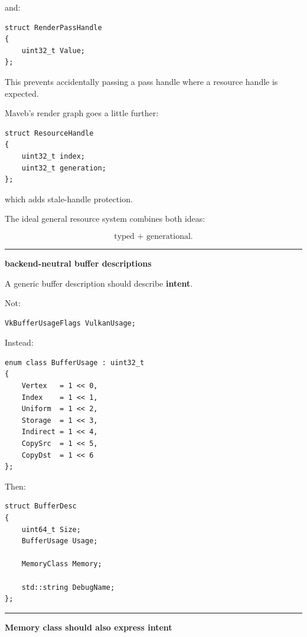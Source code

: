 and:

\begin{verbatim}
struct RenderPassHandle
{
    uint32_t Value;
};
\end{verbatim}

This prevents accidentally passing a pass handle where a resource handle is expected.

Maveb's render graph goes a little further:

\begin{verbatim}
struct ResourceHandle
{
    uint32_t index;
    uint32_t generation;
};
\end{verbatim}

which adds stale-handle protection.

The ideal general resource system combines both ideas:

\[
\boxed{
\text{typed + generational}.
}
\]

\begin{center}\rule{0.5\linewidth}{0.5pt}\end{center}

\textbf{backend-neutral buffer descriptions}

A generic buffer description should describe \textbf{intent}.

Not:

\begin{verbatim}
VkBufferUsageFlags VulkanUsage;
\end{verbatim}

Instead:

\begin{verbatim}
enum class BufferUsage : uint32_t
{
    Vertex   = 1 << 0,
    Index    = 1 << 1,
    Uniform  = 1 << 2,
    Storage  = 1 << 3,
    Indirect = 1 << 4,
    CopySrc  = 1 << 5,
    CopyDst  = 1 << 6
};
\end{verbatim}

Then:

\begin{verbatim}
struct BufferDesc
{
    uint64_t Size;
    BufferUsage Usage;

    MemoryClass Memory;

    std::string DebugName;
};
\end{verbatim}

\begin{center}\rule{0.5\linewidth}{0.5pt}\end{center}

\textbf{Memory class should also express intent}

